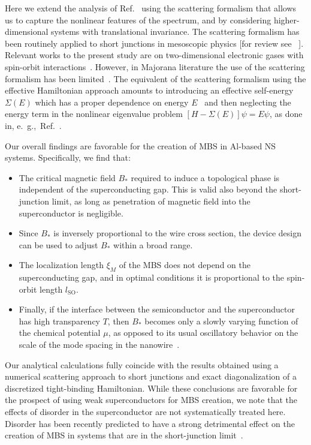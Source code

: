Here we extend the analysis of Ref.~\cite{Cole2015} using the scattering formalism that allows us to capture the nonlinear features of the spectrum, and by considering higher-dimensional systems with translational invariance.
The scattering formalism has been routinely applied to short junctions in mesoscopic physics [for review see ~\cite{Beenakker2005}].
Relevant works to the present study are on two-dimensional electronic gases with spin-orbit interactions~\cite{Bezuglyi2002, Dimitrova2006}.
However, in Majorana literature the use of the scattering formalism has been limited~\cite{Cheng2012}.
The equivalent of the scattering formalism using the effective Hamiltonian approach amounts to introducing an effective self-energy $\Sigma(E)$ which has a proper dependence on energy $E$~\cite{Liu2012, Stanescu2013, Peng2015} and then neglecting the energy term in the nonlinear eigenvalue problem $[H-\Sigma(E)]\psi = E\psi$, as done in, e.~g.,~Ref.~\cite{Poeyhoenen2016}.

Our overall findings are favorable for the creation of MBS in Al-based NS systems.
Specifically, we find that:
\begin{itemize}
\item The critical magnetic field $B_*$ required to induce a topological phase is independent of the superconducting gap.
 This is valid also beyond the short-junction limit, as long as penetration of magnetic field into the superconductor is negligible.
\item Since $B_*$ is inversely proportional to the wire cross section, the device design can be used to adjust $B_*$ within a broad range.
\item The localization length $\xi_M$ of the MBS does not depend on the superconducting gap, and in optimal conditions it is proportional to the spin-orbit length $l_\textrm{SO}$.
\item Finally, if the interface between the semiconductor and the superconductor has high transparency $T$, then $B_*$ becomes only a slowly varying function of the chemical potential $\mu$, as opposed to its usual oscillatory behavior on the scale of the mode spacing in the nanowire~\cite{Wimmer2010, Lutchyn2011}.
\end{itemize}
Our analytical calculations fully coincide with the results obtained using a numerical scattering approach to short junctions and exact diagonalization of a discretized tight-binding Hamiltonian.
While these conclusions are favorable for the prospect of using weak superconductors for MBS creation, we note that the effects of disorder in the superconductor are not systematically treated here.
Disorder has been recently predicted to have a strong detrimental effect on the creation of MBS in systems that are in the short-junction limit~\cite{Cole2016}.

